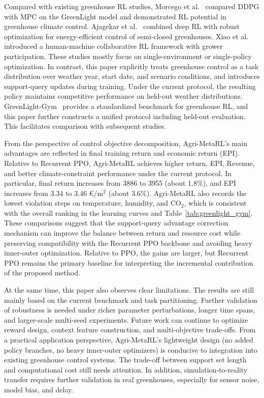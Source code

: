 \documentclass[number,preprint,review,12pt]{elsarticle}
\begin{document}
Compared with existing greenhouse RL studies, Morcego et al.~\cite{morcego2023reinforcement} compared DDPG with MPC on the GreenLight model and demonstrated RL potential in greenhouse climate control. Ajagekar et al.~\cite{ajagekar2023energy} combined deep RL with robust optimization for energy-efficient control of semi-closed greenhouses. Xiao et al.~\cite{xiao2026grower} introduced a human-machine collaborative RL framework with grower participation. These studies mostly focus on single-environment or single-policy optimization. In contrast, this paper explicitly treats greenhouse control as a task distribution over weather year, start date, and scenario conditions, and introduces support-query updates during training. Under the current protocol, the resulting policy maintains competitive performance on held-out weather distributions. GreenLight-Gym~\cite{van2025greenlight} provides a standardized benchmark for greenhouse RL, and this paper further constructs a unified protocol including held-out evaluation. This facilitates comparison with subsequent studies.

From the perspective of control objective decomposition, Agri-MetaRL's main advantages are reflected in final training return and economic return (EPI). Relative to Recurrent PPO, Agri-MetaRL achieves higher return, EPI, Revenue, and better climate-constraint performance under the current protocol. In particular, final return increases from 3886 to 3955 (about 1.8\%), and EPI increases from 3.34 to 3.46 €/m$^2$ (about 3.6\%). Agri-MetaRL also records the lowest violation steps on temperature, humidity, and CO$_2$, which is consistent with the overall ranking in the learning curves and Table~\ref{tab:greenlight_gym}. These comparisons suggest that the support-query advantage correction mechanism can improve the balance between return and resource cost while preserving compatibility with the Recurrent PPO backbone and avoiding heavy inner-outer optimization. Relative to PPO, the gains are larger, but Recurrent PPO remains the primary baseline for interpreting the incremental contribution of the proposed method.

At the same time, this paper also observes clear limitations. The results are still mainly based on the current benchmark and task partitioning. Further validation of robustness is needed under richer parameter perturbations, longer time spans, and larger-scale multi-seed experiments. Future work can continue to optimize reward design, context feature construction, and multi-objective trade-offs. From a practical application perspective, Agri-MetaRL's lightweight design (no added policy branches, no heavy inner-outer optimizers) is conducive to integration into existing greenhouse control systems. The trade-off between support set length and computational cost still needs attention. In addition, simulation-to-reality transfer requires further validation in real greenhouses, especially for sensor noise, model bias, and delay.
\end{document}
